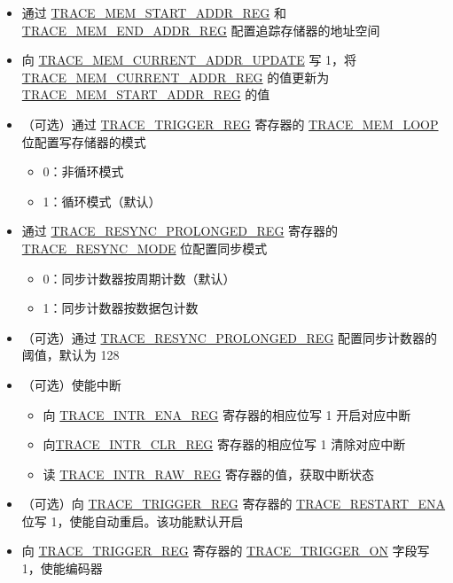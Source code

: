 \documentclass[main\_\_CN.tex]{subfiles}
\begin{document}
\begin{itemize}
    \item 通过 \hyperref[regdesc:TRACEMEMSTARTADDRREG]{TRACE\_MEM\_START\_ADDR\_REG} 和 \hyperref[regdesc:TRACEMEMENDADDRREG]{TRACE\_MEM\_END\_ADDR\_REG} 配置追踪存储器的地址空间

    \item 向 \hyperref[fielddesc:TRACEMEMCURRENTADDRUPDATE]{TRACE\_MEM\_CURRENT\_ADDR\_UPDATE} 写 1，将 \hyperref[regdesc:TRACEMEMCURRENTADDRREG]{TRACE\_MEM\_CURRENT\_ADDR\_REG} 的值更新为 \hyperref[regdesc:TRACEMEMSTARTADDRREG]{TRACE\_MEM\_START\_ADDR\_REG} 的值

    \item（可选）通过 \hyperref[regdesc:TRACETRIGGERREG]{TRACE\_TRIGGER\_REG} 寄存器的 \hyperref[fielddesc:TRACEMEMLOOP]{TRACE\_MEM\_LOOP} 位配置写存储器的模式
        \begin{itemize}
            \item 0：非循环模式
            \item 1：循环模式（默认）
        \end{itemize}


    \item 通过 \hyperref[regdesc:TRACERESYNCPROLONGEDREG]{TRACE\_RESYNC\_PROLONGED\_REG} 寄存器的 \hyperref[fielddesc:TRACERESYNCMODE]{TRACE\_RESYNC\_MODE} 位配置同步模式
        \begin{itemize}
                    \item 0：同步计数器按周期计数（默认）
                    \item 1：同步计数器按数据包计数
                \end{itemize}

    \item（可选）通过 \hyperref[regdesc:TRACERESYNCPROLONGEDREG]{TRACE\_RESYNC\_PROLONGED\_REG} 配置同步计数器的阈值，默认为 128

    \item（可选）使能中断
        \begin{itemize}
            \item 向 \hyperref[regdesc:TRACEINTRENAREG]{TRACE\_INTR\_ENA\_REG} 寄存器的相应位写 1 开启对应中断
            \item 向\hyperref[regdesc:TRACEINTRCLRREG]{TRACE\_INTR\_CLR\_REG} 寄存器的相应位写 1 清除对应中断
            \item 读 \hyperref[regdesc:TRACEINTRRAWREG]{TRACE\_INTR\_RAW\_REG} 寄存器的值，获取中断状态
        \end{itemize}

    \item （可选）向 \hyperref[regdesc:TRACETRIGGERREG]{TRACE\_TRIGGER\_REG} 寄存器的 \hyperref[fielddesc:TRACERESTARTENA]{TRACE\_RESTART\_ENA} 位写 1，使能自动重启。该功能默认开启

    \item 向 \hyperref[regdesc:TRACETRIGGERREG]{TRACE\_TRIGGER\_REG} 寄存器的 \hyperref[fielddesc:TRACETRIGGERON]{TRACE\_TRIGGER\_ON} 字段写 1，使能编码器

\end{itemize}
\end{document}
